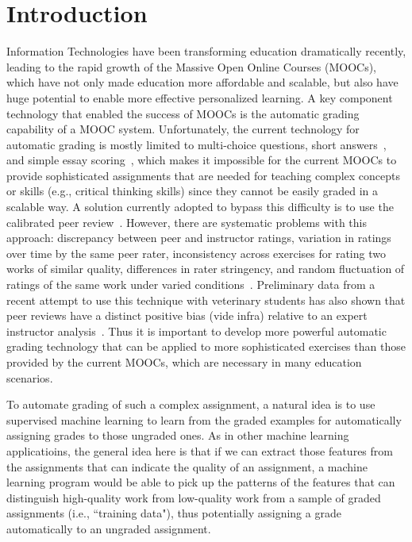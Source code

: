 \section{Introduction}

Information Technologies have been transforming education dramatically
recently, leading to the rapid growth of the Massive Open Online Courses
(MOOCs), which have not only made education more affordable and scalable,
but also have huge potential to enable more effective personalized
learning.  A key component technology that enabled the success of MOOCs is
the automatic grading capability of a MOOC system. Unfortunately, the
current technology for automatic grading is mostly limited to multi-choice
questions, short answers~\cite{Brooks:2014:Powergrading,
Leacock:2003:CatH, Mitchell:2002:ICAA, Pulman:2005:EdAppsNLP,
Mohler:2009:EACL}, and simple essay scoring~\cite{Chen:2014:IRRODL,
Balfour:2013}, which makes it impossible for the current MOOCs to provide
sophisticated assignments that are needed for teaching complex concepts or
skills (e.g., critical thinking skills) since they cannot be easily graded
in a scalable way. A solution currently adopted to bypass this difficulty
is to use the calibrated peer review~\cite{Balfour:2013, Chen:2014:IRRODL,
Sandeen:2013, Suen:2014}.  However, there are systematic problems with this
approach: discrepancy between peer and instructor ratings, variation in
ratings over time by the same peer rater, inconsistency across exercises
for rating two works of similar quality, differences in rater stringency,
and random fluctuation of ratings of the same work under varied
conditions~\cite{Suen:2014}. 
Preliminary data from a recent attempt to use this technique with
veterinary students has also shown that peer reviews have a distinct
positive bias (vide infra) relative to an expert instructor
analysis~\cite{Ferguson:2014}.
 Thus it is important to develop more
powerful automatic grading technology that can be applied to more
sophisticated exercises than those provided by the current MOOCs, which are
necessary in many education scenarios.



To automate grading of such a complex assignment, a natural idea is to
use supervised machine learning to learn from the graded examples for
automatically assigning grades to those ungraded ones. As in other machine learning
applicatioins, the general idea here is that if we can extract those features from the assignments that can indicate
the quality of an assignment, a machine learning program would be able to pick up
the patterns of the features that can distinguish high-quality work from low-quality work from a sample of graded assignments (i.e., ``training data"),  
thus potentially assigning a grade automatically to an ungraded assignment.  

